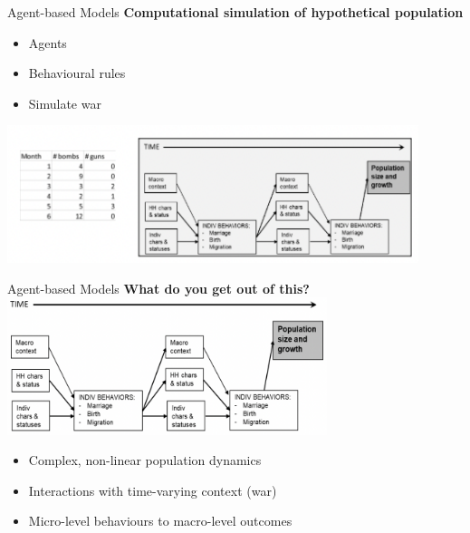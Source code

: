 \documentclass{beamer}
\begin{document}
		\begin{frame}{Agent-based Models}
			\textbf{Computational simulation of hypothetical population}
			\begin{itemize}
				\item Agents
				\item Behavioural rules
				\item Simulate war
			\end{itemize}

			\includegraphics[width=0.9\textwidth]{Images/method2.png}
		\end{frame}
		
		\begin{frame}{Agent-based Models}
			\textbf{What do you get out of this?}
			\includegraphics[width=0.7\textwidth]{Images/con2.png}

			\begin{itemize}
				\item Complex, non-linear population dynamics
				\item Interactions with time-varying context (war)
				\item Micro-level behaviours to macro-level outcomes
			\end{itemize}

		\end{frame}
\end{document}
